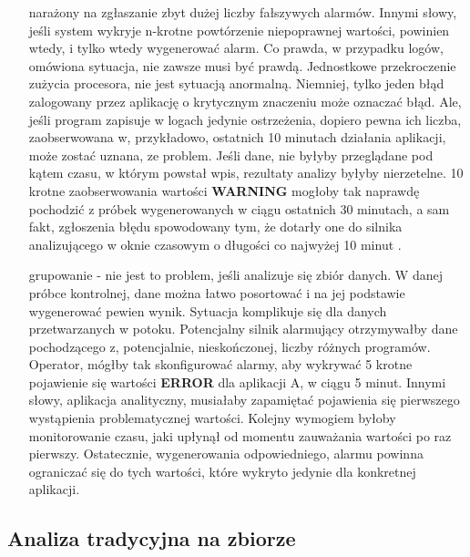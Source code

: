 \begin{itemize}
        narażony na zgłaszanie zbyt dużej liczby fałszywych alarmów. Innymi słowy, jeśli system wykryje n-krotne powtórzenie 
        niepoprawnej wartości, powinien wtedy, i tylko wtedy wygenerować alarm. 
        Co prawda, w przypadku logów, omówiona sytuacja, nie zawsze musi być prawdą. Jednostkowe przekroczenie zużycia procesora, nie jest sytuacją anormalną.
        Niemniej, tylko jeden błąd zalogowany przez aplikację o krytycznym znaczeniu może oznaczać błąd. Ale, jeśli program zapisuje w logach jedynie ostrzeżenia,
        dopiero pewna ich liczba, zaobserwowana w, przykładowo, ostatnich 10 minutach działania aplikacji, może zostać uznana, ze problem. Jeśli dane, nie byłyby
        przeglądane pod kątem czasu, w którym powstał wpis, rezultaty analizy byłyby nierzetelne. 10 krotne zaobserwowania wartości \textbf{WARNING} mogłoby tak naprawdę
        pochodzić z próbek wygenerowanych w ciągu ostatnich 30 minutach, a sam fakt, zgłoszenia błędu spowodowany tym, że dotarły one do silnika analizującego
        w oknie czasowym o długości co najwyżej 10 minut \cite{8_requirements_of_real_time_processing}.
        \item[grupowanie] - nie jest to problem, jeśli analizuje się zbiór danych. W danej próbce kontrolnej, dane można łatwo posortować i na jej podstawie 
        wygenerować pewien wynik. Sytuacja komplikuje się dla danych przetwarzanych w potoku. Potencjalny silnik alarmujący otrzymywałby dane pochodzącego z,
        potencjalnie, nieskończonej, liczby różnych programów. Operator, mógłby tak skonfigurować alarmy, aby wykrywać 5 krotne pojawienie się wartości \textbf{ERROR}
        dla aplikacji A, w ciągu 5 minut. Innymi słowy, aplikacja analityczny, musiałaby zapamiętać pojawienia się pierwszego wystąpienia problematycznej wartości.
        Kolejny wymogiem byłoby monitorowanie czasu, jaki upłynął od momentu zauważania wartości po raz pierwszy. Ostatecznie, wygenerowania odpowiedniego,
        alarmu powinna ograniczać się do tych wartości, które wykryto jedynie dla konkretnej aplikacji.
    \end{itemize}
    
    \subsection{Analiza tradycyjna na zbiorze}
    \label{chapter:application_own:plans:alarm_on_logs:bulk}
    
